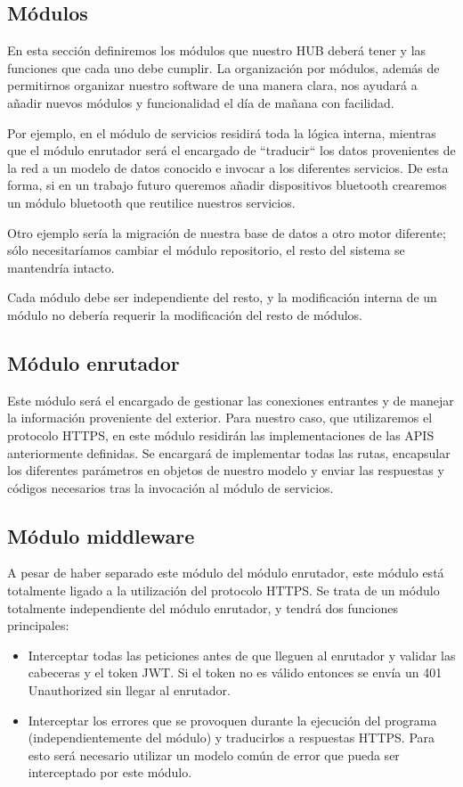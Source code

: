 \subsection{Módulos}
En esta sección definiremos los módulos que nuestro HUB deberá tener y las funciones que cada uno debe cumplir. La organización por módulos, además
de permitirnos organizar nuestro software de una manera clara, nos ayudará a añadir nuevos módulos y funcionalidad el día de mañana con facilidad.
\par
Por ejemplo, en el módulo de servicios residirá toda la lógica interna, mientras que el módulo enrutador será el encargado de ``traducir`` los datos
provenientes de la red a un modelo de datos conocido e invocar a los diferentes servicios. De esta forma, si en un trabajo futuro queremos añadir
dispositivos bluetooth crearemos un módulo bluetooth que reutilice nuestros servicios.
\par
Otro ejemplo sería la migración de nuestra base de datos a otro motor diferente; sólo necesitaríamos cambiar el módulo repositorio, el resto del sistema
se mantendría intacto.
\par
Cada módulo
debe ser independiente del resto, y la modificación interna de un módulo no debería requerir la modificación del resto de módulos.
\subsection{Módulo enrutador}
Este módulo será el encargado de gestionar las conexiones entrantes y de manejar la información proveniente del exterior. Para nuestro caso, que utilizaremos
el protocolo HTTPS, en este módulo residirán las implementaciones de las APIS anteriormente definidas. Se encargará de implementar todas las rutas, encapsular
los diferentes parámetros en objetos de nuestro modelo y enviar las respuestas y códigos necesarios tras la invocación al módulo de servicios.
\subsection{Módulo middleware}
A pesar de haber separado este módulo del módulo enrutador, este módulo está totalmente ligado a la utilización del protocolo HTTPS. 
Se trata de un módulo totalmente independiente del módulo enrutador, y tendrá dos funciones principales:
\begin{itemize}
\setlength\itemsep{6pt plus 1pt minus 1pt}
\item Interceptar todas las peticiones antes de que lleguen al enrutador y validar las cabeceras y el token JWT. Si el token no es válido entonces
se envía un 401 Unauthorized sin llegar al enrutador.
\item Interceptar los errores que se provoquen durante la ejecución del programa (independientemente del módulo) y traducirlos a respuestas HTTPS. Para esto 
será necesario utilizar un modelo común de error que pueda ser interceptado por este módulo.
\end{itemize}
